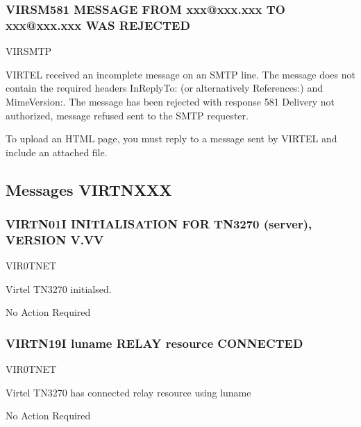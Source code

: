\documentclass[letterpaper,10pt,english]{sphinxmanual}
\begin{document}
\subsubsection{VIRSM581 MESSAGE FROM xxx@xxx.xxx TO xxx@xxx.xxx WAS REJECTED}
\label{\detokenize{messages:virsm581-message-from-xxx-xxx-xxx-to-xxx-xxx-xxx-was-rejected}}\begin{description}
\sphinxAtStartPar
VIRSMTP

\sphinxAtStartPar
VIRTEL received an incomplete message on an SMTP line. The message does not contain the required headers In\sphinxhyphen{}Reply\sphinxhyphen{}To: (or alternatively References:) and Mime\sphinxhyphen{}Version:. The message has been rejected with response 581 Delivery not authorized, message refused sent to the SMTP requester.

\sphinxAtStartPar
To upload an HTML page, you must reply to a message sent by VIRTEL and include an attached file.

\end{description}


\subsection{Messages VIRTNXXX}
\label{\detokenize{messages:id7}}

\subsubsection{VIRTN01I INITIALISATION FOR TN3270 (server), VERSION V.VV}
\label{\detokenize{messages:virtn01i-initialisation-for-tn3270-server-version-v-vv}}\begin{description}
\sphinxAtStartPar
VIR0TNET

\sphinxAtStartPar
Virtel TN3270 initialsed.

\sphinxAtStartPar
No Action Required

\end{description}


\subsubsection{VIRTN19I luname RELAY resource CONNECTED}
\label{\detokenize{messages:virtn19i-luname-relay-resource-connected}}\begin{description}
\sphinxAtStartPar
VIR0TNET

\sphinxAtStartPar
Virtel TN3270 has connected relay resource using luname

\sphinxAtStartPar
No Action Required

\end{description}
\end{document}
